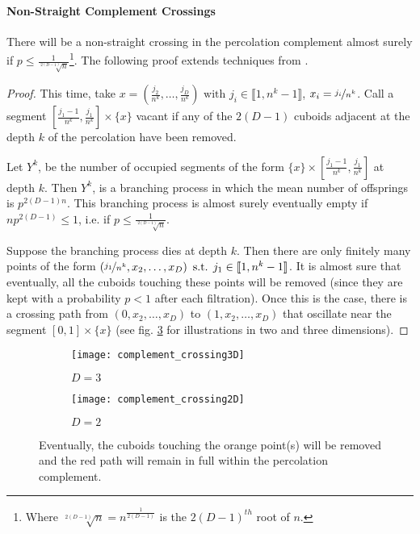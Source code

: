 \paragraph{Non-Straight Complement Crossings}
There will be a non-straight crossing in the percolation complement almost surely if $p \leq \frac{1}{\sqrt[2(D-1)]{n}}$\footnote{Where $\sqrt[2(D-1)]{n} = n^{\frac{1}{2(D-1)}}$ is the $2(D-1)^{th}$ root of $n$.}.
The following proof extends techniques from \cite[p.310 b.(2)]{Chayes_1988}.
\begin{proof}\label{prf:nonStraightComplementCrossigs}
	This time, take $x = \left( \frac{j_2}{n^k},\dots,\frac{j_D}{n^k} \right) \text{ with } j_i \in \llbracket 1,n^k-1 \rrbracket$, $x_i = \nicefrac{j_i}{n^k}$.
	Call a segment $\left[ \frac{j_1-1}{n^k},\frac{j_1}{n^k} \right] \times \{ x \}$ vacant if any of the $2(D-1)$ cuboids adjacent at the depth $k$ of the percolation have been removed.
	
	Let $Y^k$, be the number of occupied segments of the form $\{ x \} \times \left[ \frac{j_1-1}{n^k},\frac{j_1}{n^k} \right]$ at depth $k$.
	Then $Y^k$, is a branching process in which the mean number of offsprings is $p^{2(D-1)n}$.
	This branching process is almost surely eventually empty if $np^{2(D-1)} \leq 1$, i.e. if $p \leq \frac{1}{\sqrt[2(D-1)]{n}}$.
	
	Suppose the branching process dies at depth $k$.
	Then there are only finitely many points of the form $\left( \nicefrac{j_1}{n^k}, x_2,\dots,x_D \right) \text{ s.t. } j_1 \in \llbracket 1,n^k-1 \rrbracket$.
	It is almost sure that eventually, all the cuboids touching these points will be removed (since they are kept with a probability $p<1$ after each filtration).
	Once this is the case, there is a crossing path from $\left( 0, x_2,\dots,x_D \right)$ to $\left( 1, x_2,\dots,x_D \right)$ that oscillate near the segment $\left[ 0,1 \right] \times \{ x \}$ (see fig. \ref{fig:complementCrossing} for illustrations in two and three dimensions).
\end{proof}

\begin{figure}[!h]
	\vspace{-0.75cm}
	\begin{subfigure}{0.44\linewidth}
		\texttt{[image: complement\_crossing3D]}
		\centering
		\captionsetup{justification=centering}
		\caption{$D = 3$}
		\label{fig:complementCrossing3D}
	\end{subfigure}
	\hspace{0.1\linewidth}
	\begin{subfigure}{0.44\linewidth}
		\texttt{[image: complement\_crossing2D]}
		\centering
		\captionsetup{justification=centering}
		\caption{$D = 2$}
		\label{fig:complementCrossing2D}
	\end{subfigure}
	\centering
	\caption{Eventually, the cuboids touching the orange point(s) will be removed and the red path will remain in full within the percolation complement.}
	\label{fig:complementCrossing}
\end{figure}


